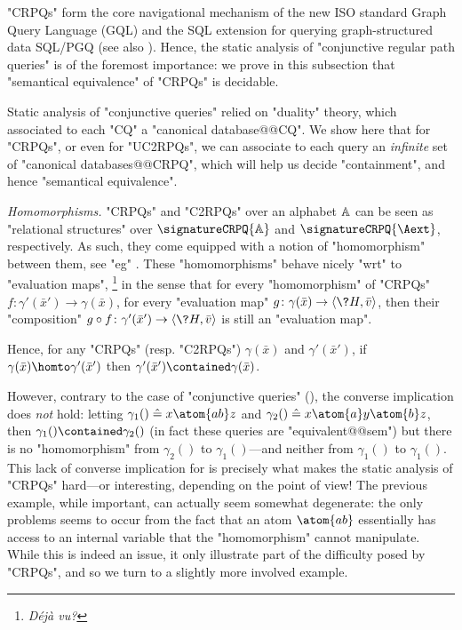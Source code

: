 "CRPQs" form the core navigational mechanism of the new ISO standard Graph Query Language (GQL) \cite{ISO2024GQL} and the SQL extension for querying graph-structured data SQL/PGQ \cite{ISO2023PGQ} (see also \cite{FrancisEtal2023GQL,FrancisEtal2023GPC}).
Hence, the static analysis of "conjunctive regular path queries" is of the foremost
importance: we prove in this subsection that "semantical equivalence" of "CRPQs" is decidable.

Static analysis of "conjunctive queries" relied on "duality" theory,
which associated to each "CQ" a "canonical database@@CQ". 
We show here that for "CRPQs", or even for "UC2RPQs", we can associate
to each query an \emph{infinite} set of "canonical databases@@CRPQ", which will help us
decide "containment", and hence "semantical equivalence".

\emph{Homomorphisms.} "CRPQs" and "C2RPQs" over an alphabet $\mathbb{A}$
can be seen as "relational structures" over $\signatureCRPQ{\A}$ and $\signatureCRPQ{\Aext}$,
respectively. As such, they come equipped with a notion of "homomorphism" between them,
see "eg" . These "homomorphisms" behave nicely "wrt" to "evaluation maps",%
\footnote{\emph{Déjà vu?}}
in the sense that for every "homomorphism" of "CRPQs" $f\colon \gamma'(\bar x') \to \gamma(\bar x)$,
for every "evaluation map" $g\colon \gamma(\bar x) \to \tup{\?H, \bar v}$,
then their "composition" $g \circ f\colon \gamma'(\bar x') \to \tup{\?H, \bar v}$
is still an "evaluation map".
\begin{fact}
    \label{fact:hom-implies-contained}
    Hence, for any "CRPQs" (resp. "C2RPQs") $\gamma(\bar x)$ and $\gamma'(\bar x')$,
    if $\gamma(\bar x) \homto \gamma'(\bar x')$ then $\gamma'(\bar x') \contained
    \gamma(\bar x)$.
\end{fact}
However, contrary to the case of "conjunctive queries" (),
the converse implication does \emph{not} hold: letting
$\gamma_1() \defeq x \atom{ab} z$ and $\gamma_2() \defeq x \atom{a} y \atom{b} z$,
then $\gamma_1() \contained \gamma_2()$ (in fact these queries are "equivalent@@sem")
but there is no "homomorphism" from $\gamma_2()$ to $\gamma_1()$---and neither
from $\gamma_1()$ to $\gamma_1()$.
This lack of converse implication for   is precisely what
makes the static analysis of "CRPQs" hard---or interesting, depending on the point of view!
The previous example, while important, can actually seem somewhat degenerate: the only problems
seems to occur from the fact that an atom $\atom{ab}$ essentially has access to an
internal variable that the "homomorphism" cannot manipulate.
While this is indeed an issue, it only illustrate part of the difficulty
posed by "CRPQs", and so we turn to a slightly more involved example.

